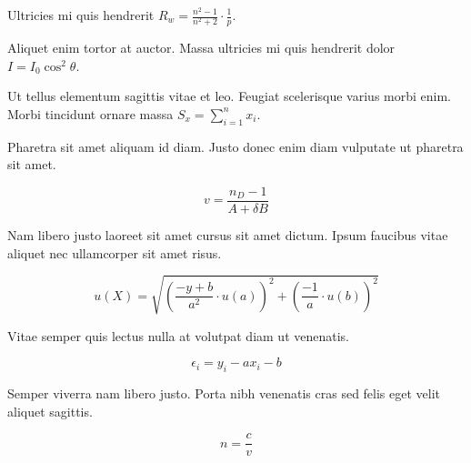 \documentclass{article}
\begin{document}
Ultricies mi quis hendrerit \begin{math}
	R_w=\frac{n^2-1}{n^2+2} \cdot \frac{1}{p}
\end{math}.\newline

Aliquet enim tortor at auctor. Massa ultricies mi quis hendrerit dolor $ I=I_0\cos ^2\theta $.\newline

Ut tellus elementum sagittis vitae et leo. Feugiat scelerisque varius morbi enim. Morbi tincidunt ornare massa \( S_x=\sum_{i=1}^{n}x_i \).\newline

Pharetra sit amet aliquam id diam. Justo donec enim diam vulputate ut pharetra sit amet.

\[ v=\frac{n_D-1}{A+\delta B} \]

Nam libero justo laoreet sit amet cursus sit amet dictum. Ipsum faucibus vitae aliquet nec ullamcorper sit amet risus.

$$ u(X)=\sqrt{(\frac{-y+b}{a^2}\cdot u(a))^2+(\frac{-1}{a}\cdot u(b))^2} $$

Vitae semper quis lectus nulla at volutpat diam ut venenatis.

\begin{displaymath}
	\epsilon_i=y_i-ax_i-b
\end{displaymath}

Semper viverra nam libero justo. Porta nibh venenatis cras sed felis eget velit aliquet sagittis.

\begin{equation}
	n=\frac{c}{v}
\end{equation}
\end{document}
